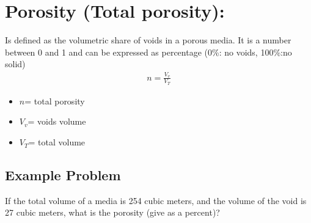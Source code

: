 \documentclass[letterpaper,10pt,english]{jupyterBook}
\begin{document}
\section{Porosity (Total porosity):}
\label{\detokenize{content/flow/12_subsurface_structure:porosity-total-porosity}}
\sphinxAtStartPar
Is defined as the volumetric share of voids in a porous media. It is a number between 0 and 1 and can be expressed as percentage (0\%: no voids, 100\%:no solid)
\begin{equation*}
\begin{split}{n}=\frac{V_{v}}{V_{T}}\end{split}
\end{equation*}\begin{itemize}
\item {} 
\sphinxAtStartPar
\(n\)= total porosity

\item {} 
\sphinxAtStartPar
\({V_{v}}\)= voids volume

\item {} 
\sphinxAtStartPar
\({V_{T}}\)= total volume

\end{itemize}


\subsection{Example Problem}
\label{\detokenize{content/flow/12_subsurface_structure:example-problem}}
\sphinxAtStartPar
If the total volume of a media is 254 cubic meters, and the volume of the void is 27 cubic meters, what is the porosity (give as a percent)?
\end{document}
